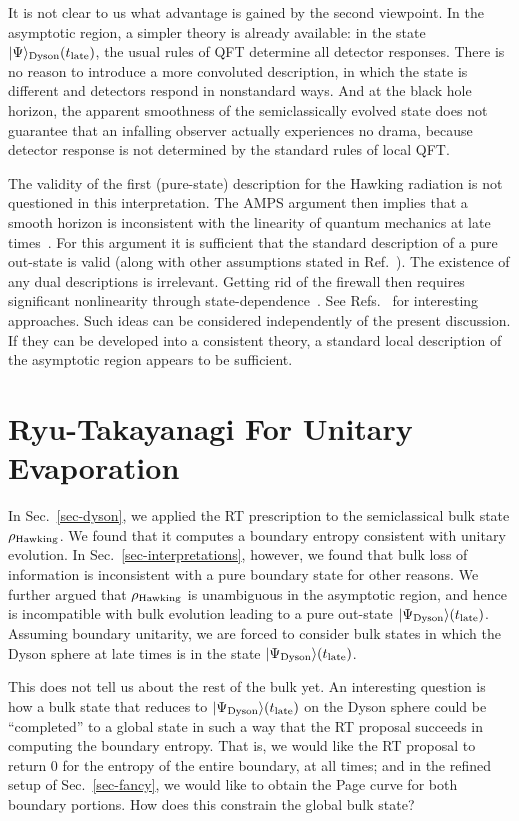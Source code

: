 \documentclass[12pt,letterpaper]{article}
\begin{document}
It is not clear to us what advantage is gained by the second viewpoint. In the asymptotic region, a simpler theory is already available: in the state $|\Psi\rangle_{\rm Dyson}(t_{\rm late})$, the usual rules of QFT determine all detector responses. There is no reason to introduce a more convoluted description, in which the state is different and detectors respond in nonstandard ways. And at the black hole horizon, the apparent smoothness of the semiclassically evolved state does not guarantee that an infalling observer actually experiences no drama, because detector response is not determined by the standard rules of local QFT.

The validity of the first (pure-state) description for the Hawking radiation is not questioned in this interpretation. The AMPS argument then implies that a smooth horizon is inconsistent with the linearity of quantum mechanics at late times~\cite{AMPS,Bou12c,AMPSS}. For this argument it is sufficient that the standard description of a pure out-state is valid (along with other assumptions stated in Ref.~\cite{AMPS}). The existence of any dual descriptions is irrelevant. Getting rid of the firewall then requires significant nonlinearity through state-dependence~\cite{Bou13,MarPol13,Bou13a}. See Refs.~\cite{PapRaj13b, MalSus13} for interesting approaches. Such ideas can be considered independently of the present discussion. If they can be developed into a consistent theory, a standard local description of the asymptotic region appears to be sufficient.

\section{Ryu-Takayanagi For Unitary Evaporation}
\label{sec-unitary}

In Sec.~\ref{sec-dyson}, we applied the RT prescription to the semiclassical bulk state $\rho_{\rm Hawking}$. We found that it computes a boundary entropy consistent with unitary evolution. In Sec.~\ref{sec-interpretations}, however, we found that bulk loss of information is inconsistent with a pure boundary state for other reasons. We further argued that $\rho_{\rm Hawking}$ is unambiguous in the asymptotic region, and hence is incompatible with bulk evolution leading to a pure out-state $|\Psi_{\rm Dyson}\rangle (t_{\rm late})$. Assuming boundary unitarity, we are forced to consider bulk states in which the Dyson sphere at late times is in the state $|\Psi_{\rm Dyson}\rangle (t_{\rm late})$.

This does not tell us about the rest of the bulk yet. An interesting question is how a bulk state that reduces to $|\Psi_{\rm Dyson}\rangle (t_{\rm late})$ on the Dyson sphere could be ``completed'' to a global state in such a way that the RT proposal succeeds in computing the boundary entropy.
That is, we would like the RT proposal to return 0 for the entropy of the entire boundary, at all times; and in the refined setup of Sec.~\ref{sec-fancy}, we would like to obtain the Page curve for both boundary portions. How does this constrain the global bulk state?
\end{document}
